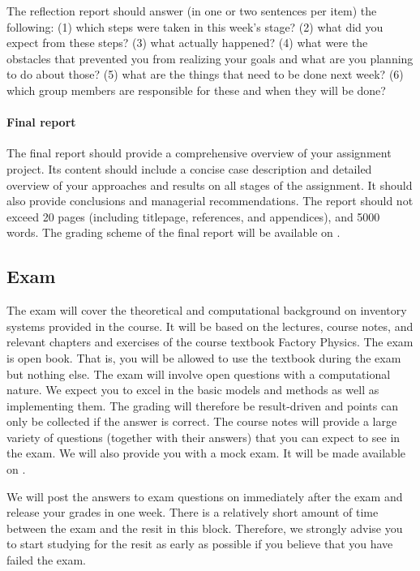 \documentclass{article}
\begin{document}
The reflection report should answer (in one or two sentences per item) the following: (1) which steps were taken in this week's stage? (2) what did you expect from these steps? (3) what actually happened? (4) what were the obstacles that prevented you from realizing your goals and what are you planning to do about those? (5) what are the things that need to be done next week? (6) which group members are responsible for these and when they will be done? 

\paragraph{Final report}
\label{par:final}

The final report should provide a comprehensive overview of your assignment project. Its content should include a concise case description and detailed overview of your approaches and results on all stages of the assignment. It should also provide conclusions and managerial recommendations. The report should not exceed 20 pages (including titlepage, references, and appendices), and 5000 words. The grading scheme of the final report will be available on \nestor.

\subsection{Exam}
\label{sec:exam}

The exam will cover the theoretical and computational background on inventory systems provided in the course. It will be based on the lectures, course notes, and relevant chapters and exercises of the course textbook Factory Physics. The exam is open book. That is, you will be allowed to use the textbook during the exam but nothing else. The exam will involve open questions with a computational nature. We expect you to excel in the basic models and methods as well as implementing them. The grading will therefore be result-driven and points can only be collected if the answer is correct. The course notes will provide a large variety of questions (together with their answers) that you can expect to see in the exam. We will also provide you with a mock exam. It will be made available on \nestor. 

We will post the answers to exam questions on \nestor immediately after the exam and release your grades in one week. There is a relatively short amount of time between the exam and the resit in this block. Therefore, we strongly advise you to start studying for the resit as early as possible if you believe that you have failed the exam.
\end{document}
